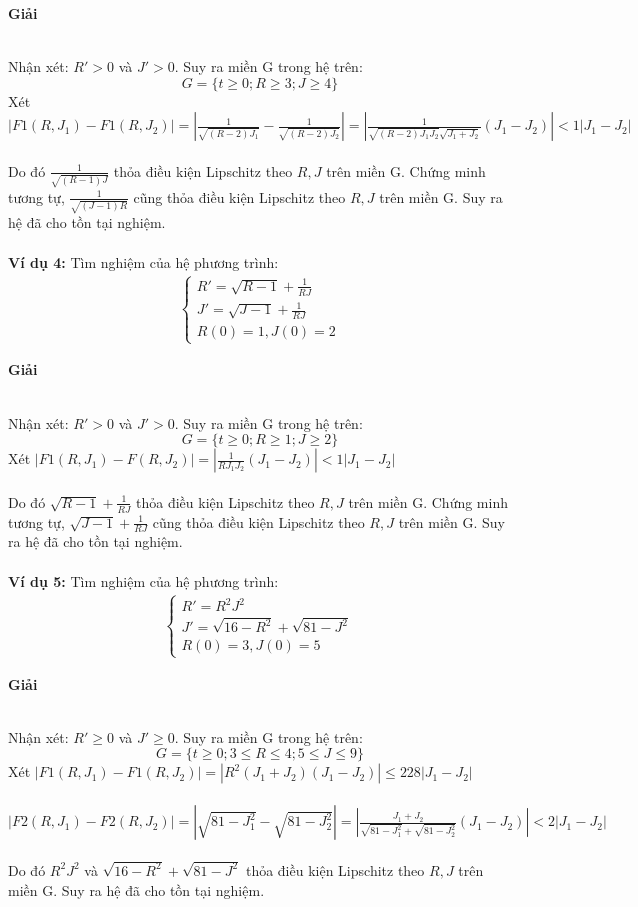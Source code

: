 \centerline{\textbf{Giải}}\\
Nhận xét: $R' > 0$ và $J' > 0$. Suy ra miền G trong hệ trên:
$$G=\{t \geq 0; R \geq 3; J\geq 4\}$$
Xét $|F1(R,J_1)-F1(R,J_2)|=|\frac{1}{\sqrt{(R-2)J_1}}-\frac{1}{\sqrt{(R-2)J_2}}|=|\frac{1}{\sqrt{(R-2)J_1J_2}\sqrt{J_1+J_2}}(J_1-J_2)| <1|J_1-J_2|$\\\\
Do đó $\frac{1}{\sqrt{(R-1)J}}$ thỏa điều kiện Lipschitz theo $R,J$ trên miền G. Chứng minh tương tự, $\frac{1}{\sqrt{(J-1)R}}$ cũng thỏa điều kiện Lipschitz theo $R,J$ trên miền G. Suy ra hệ đã cho tồn tại nghiệm.\\\\
\textbf{Ví dụ 4:} Tìm nghiệm của hệ phương trình:
\begin{align*}
    \begin{cases}
        R'=\sqrt{R-1}+\frac{1}{RJ} \\
        J'=\sqrt{J-1}+\frac{1}{RJ} \\
        R(0)=1, J(0)=2
    \end{cases}
\end{align*}
\centerline{\textbf{Giải}}\\
Nhận xét: $R' > 0$ và $J' > 0$. Suy ra miền G trong hệ trên:
$$G=\{t \geq 0; R \geq 1; J \geq 2\}$$
Xét $|F1(R,J_1)-F(R,J_2)|=|\frac{1}{RJ_1J_2}(J_1-J_2)|<1|J_1-J_2|$\\\\
Do đó $\sqrt{R-1}+\frac{1}{RJ}$ thỏa điều kiện Lipschitz theo $R,J$ trên miền G. Chứng minh tương tự, $\sqrt{J-1}+\frac{1}{RJ}$ cũng thỏa điều kiện Lipschitz theo $R,J$ trên miền G. Suy ra hệ đã cho tồn tại nghiệm.\\\\
\textbf{Ví dụ 5:} Tìm nghiệm của hệ phương trình:
\begin{align*}
    \begin{cases}
        R'=R^2J^2 \\
        J'= \sqrt{16-R^2}+\sqrt{81-J^2} \\
        R(0)=3, J(0)=5
    \end{cases}
\end{align*}
\centerline{\textbf{Giải}}\\
Nhận xét: $R' \geq 0$ và $J' \geq 0$. Suy ra miền G trong hệ trên:
$$G=\{t \geq 0; 3 \leq R \leq 4; 5 \leq J \leq 9\}$$
Xét $|F1(R,J_1)-F1(R,J_2)|=|R^2(J_1+J_2)(J_1-J_2)| \leq 228|J_1-J_2|$\\\\
\hspace*{0.7cm}$|F2(R,J_1)-F2(R,J_2)|=|\sqrt{81-J_1^2}-\sqrt{81-J_2^2}|=|\frac{J_1+J_2}{\sqrt{81-J_1^2}+\sqrt{81-J_2^2}}(J_1-J_2)|<2|J_1-J_2|$
\\\\
Do đó $R^2J^2$ và $\sqrt{16-R^2}+\sqrt{81-J^2}$ thỏa điều kiện Lipschitz theo $R,J$ trên miền G. Suy ra hệ đã cho tồn tại nghiệm.\\\\

